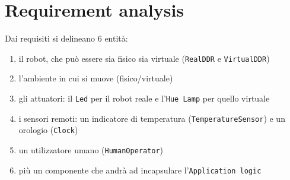 \documentclass{../llncs}
\newcommand{\code}[1]{{\color{blue}\small{\texttt{#1}}}}
\newcommand{\labelsec}[1]{\label{sec:#1}}
\begin{document}
%

\section{Requirement analysis}
\labelsec{ReqAnalysis}

Dai requisiti si delineano 6 entità:
\begin{enumerate}
\item il robot, che può essere sia fisico sia virtuale (\texttt{RealDDR} e \texttt{VirtualDDR})
\item l'ambiente in cui si muove (fisico/virtuale) %
\item gli attuatori: il \texttt{Led} per il robot reale e l'\texttt{Hue Lamp} per quello virtuale
\item i sensori remoti: un indicatore di temperatura (\texttt{TemperatureSensor}) e un orologio (\texttt{Clock})
\item un utilizzatore umano (\texttt{HumanOperator})
\item più un componente che andrà ad incapsulare l'\texttt{Application logic}
\end{enumerate}
\end{document}
